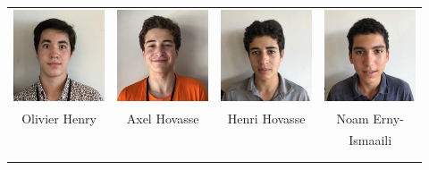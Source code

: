\begin{center}
\begin{tabular}{cccc}
\includegraphics[angle=270,origin=c, width=27mm]{eleves/Henry Olivier.JPG} &
\includegraphics[angle=270,origin=c, width=27mm]{eleves/Hovasse Axel.JPG} &
\includegraphics[angle=270,origin=c, width=27mm]{eleves/Hovasse Henri.JPG} &
\includegraphics[angle=270,origin=c, width=27mm]{eleves/Ismaaili Erny Noam.JPG} \\
Olivier Henry & Axel Hovasse & Henri Hovasse & Noam Erny-\\ & & & Ismaaili \\ \\ \\ 


\end{tabular}
\end{center}
